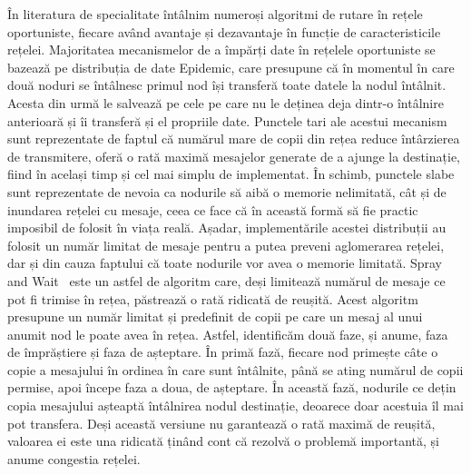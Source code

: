 \documentclass[12pt,a4paper]{report}
\begin{document}
În literatura de specialitate întâlnim numeroși algoritmi de rutare în rețele oportuniste, fiecare având avantaje și dezavantaje în funcție de caracteristicile rețelei. Majoritatea mecanismelor de a împărți date în rețelele oportuniste se bazează pe distribuția de date Epidemic, care presupune că în momentul în care două noduri se întâlnesc primul nod își transferă toate datele la nodul întâlnit.  Acesta din urmă le salvează pe cele pe care nu le deținea deja dintr-o întâlnire anterioară și îi transferă și el propriile date. Punctele tari ale acestui mecanism sunt reprezentate de faptul că numărul mare de copii din rețea reduce întârzierea de transmitere, oferă o rată maximă mesajelor generate de a ajunge la destinație, fiind în același timp și cel mai simplu de implementat. În schimb, punctele slabe sunt reprezentate de nevoia ca nodurile să aibă o memorie nelimitată, cât și de inundarea rețelei cu mesaje, ceea ce face că în această formă să fie practic imposibil de folosit în viața reală. Așadar, implementările acestei distribuții au folosit un număr limitat de mesaje pentru a putea preveni aglomerarea rețelei, dar și din cauza faptului că toate nodurile vor avea o memorie limitată. Spray and Wait~\cite{SprayAndWait} este un astfel de algoritm care, deși limitează numărul de mesaje ce pot fi trimise în rețea, păstrează o rată ridicată de reușită. Acest algoritm presupune un număr limitat și predefinit de copii pe care un mesaj al unui anumit nod le poate avea în rețea. Astfel, identificăm două faze, și anume, faza de împrăștiere și faza de așteptare. În primă fază, fiecare nod primește câte o copie a mesajului în ordinea în care sunt întâlnite, până se ating numărul de copii permise, apoi începe faza a doua, de așteptare. În această fază, nodurile ce dețin copia mesajului așteaptă întâlnirea nodul destinație, deoarece doar acestuia îl mai pot transfera. Deși această versiune nu garantează o rată maximă de reușită, valoarea ei este una ridicată ținând cont că rezolvă o problemă importantă, și anume congestia rețelei. 
\end{document}
